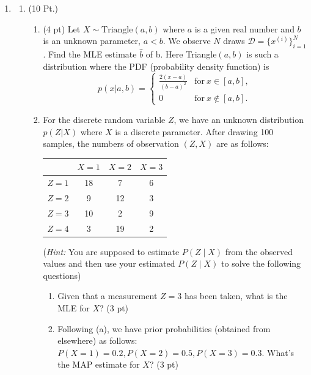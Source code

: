 \documentclass{article}
\theoremstyle{definition}
\theoremstyle{remark}
\newenvironment{Q}
        {%
          \clearpage
          \item
        }
        {%
          \phantom{s} 
          \bigskip
        }
\begin{document}
\begin{enumerate}[font={\Large\bfseries},left=0pt]
\begin{Q}
\begin{enumerate}
\item  (10 Pt.)

\begin{enumerate}


    

    \item (4 pt) Let $X \sim \text{Triangle}(a,b)$ where $a$ is a given real number and $b$ is an unknown parameter, $a<b$. We observe $N$ draws $\mathcal{D}=\{x^{(i)}\}_{i=1}^N$.
    Find the MLE estimate $\widehat{b}$ of b. Here Triangle$(a,b)$ is such a distribution where the PDF (probability density function) is 
    $$
    p(x|a,b) = \left\{ \begin{array}{ll}
    \frac {2(x-a)}{(b-a)^2} & \text{for}\ x \in \left[a,b \right],\\
    0 & \text{for}\ x \not\in \left[a,b \right].
    \end{array}\right.    
    $$

    \item   For the discrete random variable $Z$, we have an unknown distribution $p(Z|X)$ where $X$ is a discrete parameter. After drawing 100 samples, the numbers of observation $(Z,X)$ are as follows: 
    
    \begin{table}[!htb]
        \centering
        \begin{tabular}{|c|c|c|c|}
            \hline
             & $X = 1$ & $X = 2$ & $X = 3$\\
            \toprule
            \hline
            $Z = 1$ & 18 & 7 & 6\\
            \hline
            $Z = 2$ & 9 & 12 & 3\\
            \hline
            $Z = 3$ & 10 & 2 & 9\\
            \hline
            $Z = 4$ & 3 & 19 & 2\\
            \hline
        \end{tabular}
        \label{tab:my_label}
    \end{table}
    (\textit{Hint: }You are supposed to estimate $P(Z\mid X)$ from the observed values and then use your estimated $P(Z \mid X)$ to solve the following questions)
    \begin{enumerate}
        \item Given that a measurement $Z = 3$ has been taken, what is the MLE for $X$?
         (3 pt)
        \item Following (a), we have prior probabilities (obtained from elsewhere) as follows: $P(X = 1) = 0.2, P(X = 2) = 0.5, P(X = 3) = 0.3$. What's the MAP estimate for $X$? (3 pt)
    \end{enumerate}


\end{enumerate}
\end{enumerate}
\end{Q}
\end{enumerate}
\end{document}
